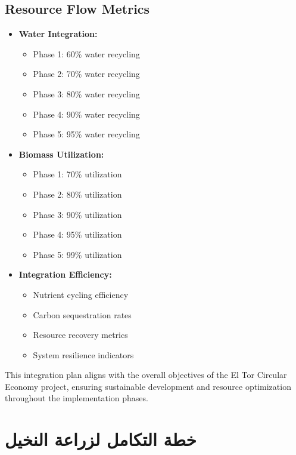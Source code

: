 \subsection{Resource Flow Metrics}
\begin{itemize}
    \item \textbf{Water Integration:}
    \begin{itemize}
        \item Phase 1: 60\% water recycling
        \item Phase 2: 70\% water recycling
        \item Phase 3: 80\% water recycling
        \item Phase 4: 90\% water recycling
        \item Phase 5: 95\% water recycling
    \end{itemize}
    \item \textbf{Biomass Utilization:}
    \begin{itemize}
        \item Phase 1: 70\% utilization
        \item Phase 2: 80\% utilization
        \item Phase 3: 90\% utilization
        \item Phase 4: 95\% utilization
        \item Phase 5: 99\% utilization
    \end{itemize}
    \item \textbf{Integration Efficiency:}
    \begin{itemize}
        \item Nutrient cycling efficiency
        \item Carbon sequestration rates
        \item Resource recovery metrics
        \item System resilience indicators
    \end{itemize}
\end{itemize}

This integration plan aligns with the overall objectives of the El Tor Circular Economy project, ensuring sustainable development and resource optimization throughout the implementation phases.

\section{خطة التكامل لزراعة النخيل}

